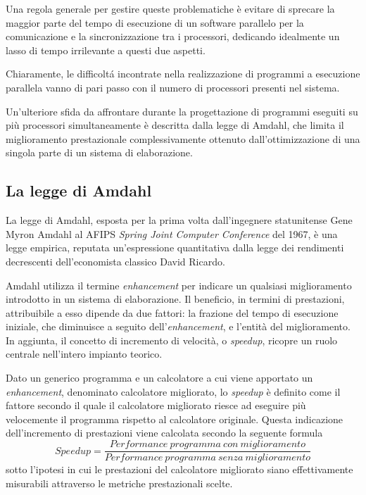Una regola generale per gestire queste problematiche \`e evitare di sprecare la maggior parte del tempo di esecuzione di un software parallelo
per la comunicazione e la sincronizzazione tra i processori, dedicando idealmente un lasso di tempo irrilevante a questi due aspetti.

Chiaramente, le difficolt\'a incontrate nella realizzazione di programmi a esecuzione parallela vanno di pari passo con il numero
di processori presenti nel sistema.

Un'ulteriore sfida da affrontare durante la progettazione di programmi eseguiti su pi\`u processori simultaneamente \`e descritta dalla legge di
Amdahl, che limita il miglioramento prestazionale complessivamente ottenuto dall'ottimizzazione di una singola parte di un sistema di
elaborazione.
\subsection{La legge di Amdahl}
La legge di Amdahl, esposta per la prima volta dall’ingegnere statunitense Gene Myron Amdahl al AFIPS \textit{Spring Joint Computer
    Conference} del 1967, \`e una legge empirica, reputata un'espressione quantitativa dalla legge dei rendimenti decrescenti dell’economista classico David Ricardo.

Amdahl utilizza il termine \textit{enhancement} per indicare un qualsiasi miglioramento introdotto in un sistema di
elaborazione.\newline
Il beneficio, in termini di prestazioni, attribuibile a esso dipende da due fattori: la frazione del tempo di esecuzione iniziale,
che diminuisce a seguito dell'\textit{enhancement}, e l'entit\`a del miglioramento.\newline
In aggiunta, il concetto di incremento di velocit\`a, o \textit{speedup}, ricopre un ruolo centrale nell'intero impianto teorico.

Dato un generico programma e un calcolatore a cui viene apportato un \textit{enhancement}, denominato calcolatore migliorato,
lo \textit{speedup} \`e definito come il fattore secondo il quale il calcolatore migliorato riesce ad eseguire più
velocemente il programma rispetto al calcolatore originale.\newline
Questa indicazione dell'incremento di prestazioni viene calcolata secondo la seguente formula
\[
    Speedup=\frac{Performance\ programma\ con\ miglioramento}{Performance\ programma\ senza\ miglioramento}
\]
sotto l’ipotesi in cui le prestazioni del calcolatore migliorato siano effettivamente misurabili attraverso le metriche
prestazionali scelte.

